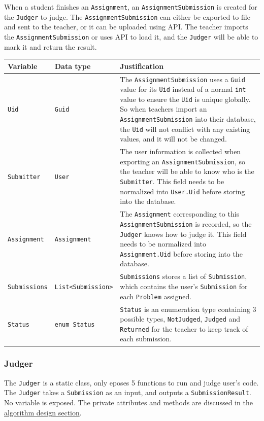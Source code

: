 \documentclass[a4paper]{report}
\newcommand{\code}{\texttt}
\begin{document}
When a student finishes an \code{Assignment}, an \code{AssignmentSubmission} is created for the \code{Judger} to judge. The \code{AssignmentSubmission} can either be exported to file and sent to the teacher, or it can be uploaded using API. The teacher imports the \code{AssignmentSubmission} or uses API to load it, and the \code{Judger} will be able to mark it and return the result.

\begin{tabulary}{\textwidth}{|l|l|L|}
    \hline
    Variable & Data type & Justification \\
    \hline
    \code{Uid} & \code{Guid} & The \code{AssignmentSubmission} uses a \code{Guid} value for its \code{Uid} instead of a normal \code{int} value to ensure the \code{Uid} is unique globally. So when teachers import an \code{AssignmentSubmission} into their database, the \code{Uid} will not conflict with any existing values, and it will not be changed. \\
    \hline
    \code{Submitter} & \code{User} & The user information is collected when exporting an \code{AssignmentSubmission}, so the teacher will be able to know who is the \code{Submitter}. This field needs to be normalized into \code{User.Uid} before storing into the database. \\
    \hline
    \code{Assignment} & \code{Assignment} & The \code{Assignment} corresponding to this \code{AssignmentSubmission} is recorded, so the \code{Judger} knows how to judge it. This field needs to be normalized into \code{Assignment.Uid} before storing into the database. \\
    \hline
    \code{Submissions} & \code{List<Submission>} & \code{Submissions} stores a list of \code{Submission}, which contains the user's \code{Submission} for each \code{Problem} assigned. \\
    \hline
    \code{Status} & \code{enum Status} & \code{Status} is an enumeration type containing 3 possible types, \code{NotJudged}, \code{Judged} and \code{Returned} for the teacher to keep track of each submission. \\
    \hline
\end{tabulary}

\subsubsection{Judger}

The \code{Judger} is a static class, only eposes 5 functions to run and judge user's code. The \code{Judger} takes a \code{Submission} as an input, and outputs a \code{SubmissionResult}. No variable is exposed. The private attributes and methods are discussed in the \hyperref[sec:algorithm design]{algorithm design section}.
\end{document}
